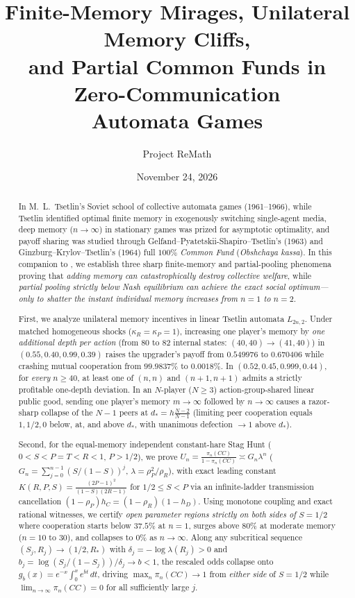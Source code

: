\documentclass[11pt,reqno]{amsart}
\title[Finite-Memory Mirages and Partial Common Funds]{Finite-Memory Mirages, Unilateral Memory Cliffs,\\
and Partial Common Funds in Zero-Communication\\
Automata Games}
\author{Project ReMath}
\date{November 24, 2026}
\theoremstyle{definition}
\theoremstyle{remark}
\begin{document}
\begin{abstract}
In M.~L.~Tsetlin's Soviet school of collective automata games (1961--1966), while Tsetlin identified optimal finite memory in exogenously switching single-agent media, deep memory ($n \to \infty$) in stationary games was prized for asymptotic optimality, and payoff sharing was studied through Gelfand--Pyatetskii-Shapiro--Tsetlin's (1963) and Ginzburg--Krylov--Tsetlin's (1964) full $100\%$ \emph{Common Fund} (\emph{Obshchaya kassa}). In this companion to \cite{Paper1}, we establish three sharp finite-memory and partial-pooling phenomena proving that \emph{adding memory can catastrophically destroy collective welfare}, while \emph{partial pooling strictly below Nash equilibrium can achieve the exact social optimum---only to shatter the instant individual memory increases from $n=1$ to $n=2$}.

First, we analyze unilateral memory incentives in linear Tsetlin automata $L_{2n,2}$. Under matched homogeneous shocks ($\kappa_R=\kappa_P=1$), increasing one player's memory by \emph{one additional depth per action} (from 80 to 82 internal states: $(40,40)\to(41,40)$) in $(0.55,0.40,0.99,0.39)$ raises the upgrader's payoff from $0.549976$ to $0.670406$ while crashing mutual cooperation from $99.9837\%$ to $0.0018\%$. In $(0.52,0.45,0.999,0.44)$, for \emph{every} $n \ge 40$, at least one of $(n,n)$ and $(n+1,n+1)$ admits a strictly profitable one-depth deviation. In an $N$-player ($N \ge 3$) action-group-shared linear public good, sending one player's memory $m \to \infty$ followed by $n \to \infty$ causes a razor-sharp collapse of the $N-1$ peers at $d_* = h\frac{N-2}{N-1}$ (limiting peer cooperation equals $1, 1/2, 0$ below, at, and above $d_*$, with unanimous defection $\to 1$ above $d_*$).

Second, for the equal-memory independent constant-hare Stag Hunt ($0<S<P=T<R<1$, $P>1/2$), we prove $U_n = \frac{\pi_n(CC)}{1-\pi_n(CC)} \asymp G_n \lambda^n$ ($G_n = \sum_{j=0}^{n-1}(S/(1-S))^j$, $\lambda = \rho_P^2/\rho_R$), with exact leading constant $K(R,P,S) = \frac{(2P-1)^2}{(1-S)(2R-1)}$ for $1/2 \le S < P$ via an infinite-ladder transmission cancellation $(1-\rho_P)h_C = (1-\rho_R)(1-h_D)$. Using monotone coupling and exact rational witnesses, we certify \emph{open parameter regions strictly on both sides of $S=1/2$} where cooperation starts below $37.5\%$ at $n=1$, surges above $80\%$ at moderate memory ($n=10$ to $30$), and collapses to $0\%$ as $n\to\infty$. Along any subcritical sequence $(S_j,R_j) \to (1/2, R_*)$ with $\delta_j = -\log\lambda(R_j) > 0$ and $b_j = \log(S_j/(1-S_j))/\delta_j \to b < 1$, the rescaled odds collapse onto $g_b(x) = e^{-x}\int_0^x e^{bt}\,dt$, driving $\max_n \pi_n(CC) \to 1$ from \emph{either side} of $S=1/2$ while $\lim_{n\to\infty}\pi_n(CC)=0$ for all sufficiently large $j$.


\end{abstract}
\end{document}
